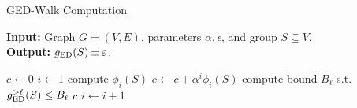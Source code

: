 \begin{algorithm}[tb]
\caption{GED-Walk Computation}
\label{algo:ged-walk-compute}
\textbf{Input:} Graph $G = (V, E)$, parameters
$\alpha, \epsilon$, and group $S \subseteq V$.\\
\textbf{Output:} $g_{\text{ED}}(S) \pm \varepsilon$.
\begin{algorithmic}[1]
\State$c \gets 0$
\State$i \gets 1$
\While{\true}
\State compute $\phi_i(S)$\label{line:ged-walk-compute:phi}
\State$c \gets c + \alpha^i \phi_i(S)$
\State compute bound $B_{\ell}$ s.t. $g_{\text{ED}}^{>\ell}(S) \le B_{\ell}$
\label{line:ged-walk-compute:bound}
\State\Return$c$
\EndIf
\State$i \gets i + 1$
\EndWhile
\end{algorithmic}
\end{algorithm}
